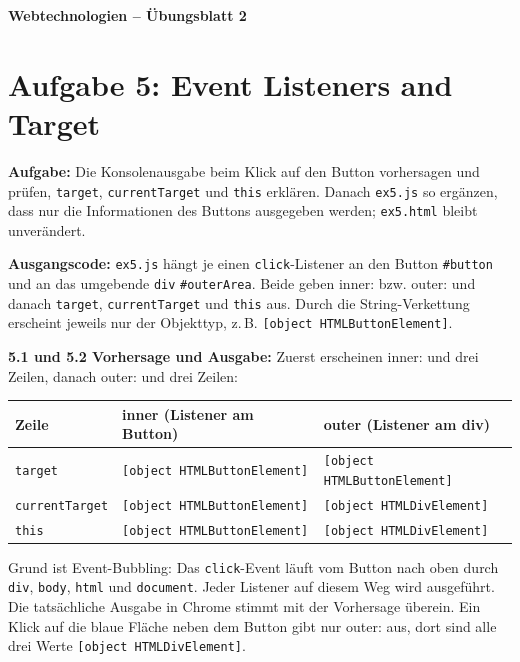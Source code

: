 \documentclass[11pt,a4paper]{article}
\begin{document}
\begin{center}
  {\Large\textbf{Webtechnologien -- Übungsblatt 2}}
\end{center}
\section*{Aufgabe 5: Event Listeners and Target}
\textbf{Aufgabe:} Die Konsolenausgabe beim Klick auf den Button vorhersagen
und prüfen, \texttt{target}, \texttt{currentTarget} und \texttt{this}
erklären. Danach \texttt{ex5.js} so ergänzen, dass nur die Informationen
des Buttons ausgegeben werden; \texttt{ex5.html} bleibt unverändert.

\medskip
\textbf{Ausgangscode:} \texttt{ex5.js} hängt je einen \texttt{click}-Listener
an den Button \texttt{\#button} und an das umgebende \texttt{div}
\texttt{\#outerArea}. Beide geben \glqq inner:\grqq{} bzw.
\glqq outer:\grqq{} und danach \texttt{target}, \texttt{currentTarget} und
\texttt{this} aus. Durch die String-Verkettung erscheint jeweils nur der
Objekttyp, z.\,B. \texttt{[object HTMLButtonElement]}.

\medskip
\textbf{5.1 und 5.2 Vorhersage und Ausgabe:} Zuerst erscheinen
\glqq inner:\grqq{} und drei Zeilen, danach \glqq outer:\grqq{} und drei Zeilen:
\begin{center}
\begin{tabular}{|l|l|l|}
\hline
\textbf{Zeile} & \textbf{inner (Listener am Button)} & \textbf{outer (Listener am div)} \\ \hline
\texttt{target} & \texttt{[object HTMLButtonElement]} & \texttt{[object HTMLButtonElement]} \\ \hline
\texttt{currentTarget} & \texttt{[object HTMLButtonElement]} & \texttt{[object HTMLDivElement]} \\ \hline
\texttt{this} & \texttt{[object HTMLButtonElement]} & \texttt{[object HTMLDivElement]} \\ \hline
\end{tabular}
\end{center}
Grund ist Event-Bubbling: Das \texttt{click}-Event läuft vom Button nach oben
durch \texttt{div}, \texttt{body}, \texttt{html} und \texttt{document}.
Jeder Listener auf diesem Weg wird ausgeführt. Die tatsächliche Ausgabe in
Chrome stimmt mit der Vorhersage überein. Ein Klick auf die blaue Fläche
neben dem Button gibt nur \glqq outer:\grqq{} aus, dort sind alle drei
Werte \texttt{[object HTMLDivElement]}.
\end{document}
